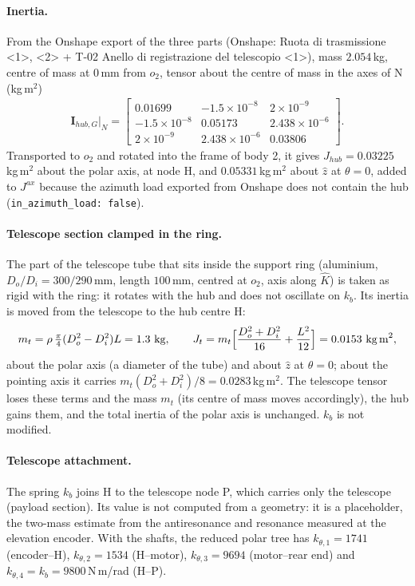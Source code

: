 \documentclass[10pt,a4paper]{article}
\numberwithin{equation}{section}
\begin{document}
\paragraph{Inertia.} From the Onshape export of the three parts (Onshape: Ruota di trasmissione <1>, <2> + T-02 Anello di registrazione del telescopio <1>), mass $2.054$\,kg, centre of mass at $0$\,mm from $o_2$, tensor about the centre of mass in the axes of N (kg\,m$^2$)
\begin{gather}
\mathbf I_{hub,G}|_N = \begin{bmatrix}0.01699 & -1.5\times10^{-8} & 2\times10^{-9} \\ -1.5\times10^{-8} & 0.05173 & 2.438\times10^{-6} \\ 2\times10^{-9} & 2.438\times10^{-6} & 0.03806\end{bmatrix}.
\end{gather}
Transported to $o_2$ and rotated into the frame of body 2, it gives $J_{hub} = 0.03225$\,kg\,m$^2$ about the polar axis, at node H, and $0.05331$\,kg\,m$^2$ about $\hat z$ at $\theta = 0$, added to $J^{ax}$ because the azimuth load exported from Onshape does not contain the hub (\texttt{in\_azimuth\_load: false}).
\paragraph{Telescope section clamped in the ring.} The part of the telescope tube that sits inside the support ring (aluminium, $D_o/D_i = 300/290$\,mm, length $100$\,mm, centred at $o_2$, axis along $\hat K$) is taken as rigid with the ring: it rotates with the hub and does not oscillate on $k_b$. Its inertia is moved from the telescope to the hub centre H:\begin{gather}m_t = \rho\,\tfrac{\pi}{4}(D_o^2 - D_i^2)L = 1.3\ \text{kg},\qquad J_t = m_t\Bigl[\frac{D_o^2 + D_i^2}{16} + \frac{L^2}{12}\Bigr] = 0.0153\ \text{kg\,m}^2,\end{gather}about the polar axis (a diameter of the tube) and about $\hat z$ at $\theta = 0$; about the pointing axis it carries $m_t(D_o^2 + D_i^2)/8 = 0.0283$\,kg\,m$^2$. The telescope tensor loses these terms and the mass $m_t$ (its centre of mass moves accordingly), the hub gains them, and the total inertia of the polar axis is unchanged. $k_b$ is not modified.
\paragraph{Telescope attachment.} The spring $k_b$ joins H to the telescope node P, which carries only the telescope (payload section). Its value is not computed from a geometry: it is a placeholder, the two-mass estimate from the antiresonance and resonance measured at the elevation encoder. With the shafts, the reduced polar tree has $k_{\theta,1} = 1741$ (encoder--H), $k_{\theta,2} = 1534$ (H--motor), $k_{\theta,3} = 9694$ (motor--rear end) and $k_{\theta,4} = k_b = 9800$\,N\,m/rad (H--P).
\end{document}
